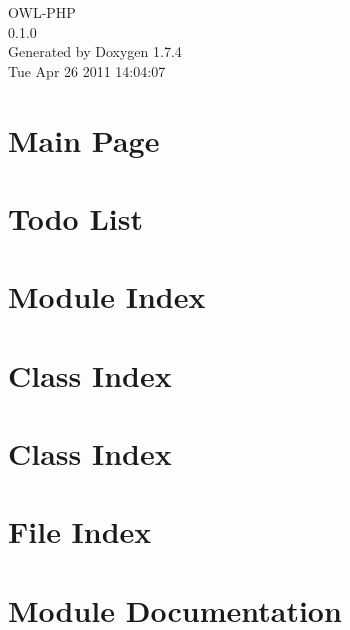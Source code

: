 \documentclass[a4paper]{book}
\begin{document}
\begin{titlepage}
\vspace*{7cm}
\begin{center}
{\Large OWL-\/PHP \\[1ex]\large 0.1.0 }\\
\vspace*{1cm}
{\large Generated by Doxygen 1.7.4}\\
\vspace*{0.5cm}
{\small Tue Apr 26 2011 14:04:07}\\
\end{center}
\end{titlepage}
\clearemptydoublepage
{}
\tableofcontents
\clearemptydoublepage
{}
\chapter{Main Page}
\label{index}
\chapter{Todo List}
\label{todo}

\chapter{Module Index}

\chapter{Class Index}

\chapter{Class Index}

\chapter{File Index}

\chapter{Module Documentation}






\end{document}

